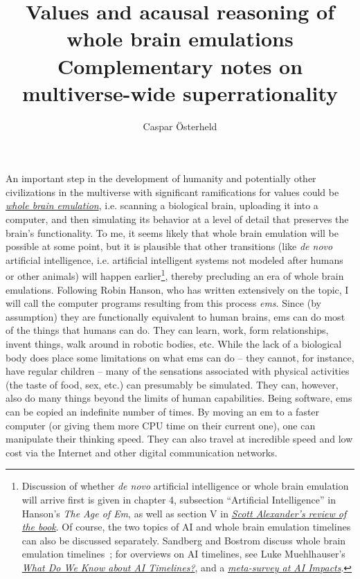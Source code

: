 \documentclass[]{article}
\title{Values and acausal reasoning of
whole brain emulations\\ \vspace{5mm} \small{Complementary notes on multiverse-wide superrationality}}
\author{Caspar \"Osterheld}
\date{}
\begin{document}
\maketitle

An important step in the development of humanity and potentially other
civilizations in the multiverse with significant ramifications for
values could be
\href{https://en.wikipedia.org/wiki/Mind_uploading}{\emph{whole
brain emulation}}, i.e. scanning a biological brain, uploading it into
a computer, and then simulating its behavior at a level of detail that
preserves the brain's functionality. To me, it seems likely that whole
brain emulation will be possible at some point, but it is plausible that
other transitions (like \emph{de novo} artificial intelligence, i.e.
artificial intelligent systems not modeled after humans or other
animals) will happen earlier\footnote{Discussion of whether \emph{de
  novo} artificial intelligence or whole brain emulation will arrive
  first is given in chapter 4, subsection ``Artificial Intelligence'' in
  Hanson's \emph{The Age of Em}, as well as section V in
  \href{http://slatestarcodex.com/2016/05/28/book-review-age-of-em/}{\emph{Scott
  Alexander's review of the book}}. Of course, the two topics of AI and
  whole brain emulation timelines can also be discussed separately.
  Sandberg and Bostrom discuss whole brain emulation
  timelines~\parencite{Sandberg2008-nd}; for overviews on AI timelines, see Luke Muehlhauser's
  \href{http://www.openphilanthropy.org/focus/global-catastrophic-risks/potential-risks-advanced-artificial-intelligence/ai-timelines}{\emph{What Do We Know about AI Timelines?}}, and a
  \href{http://aiimpacts.org/ai-timeline-surveys/}{\emph{meta-survey at
  AI Impacts}}.}, thereby precluding an era of whole brain
emulations. Following Robin Hanson, who has written extensively on the
topic, I will call the computer programs resulting from this process
\emph{ems}. Since (by assumption) they are functionally equivalent to
human brains, ems can do most of the things that humans can do. They can
learn, work, form relationships, invent things, walk around in robotic
bodies, etc. While the lack of a biological body does place some
limitations on what ems can do -- they cannot, for instance, have
regular children -- many of the sensations associated with physical
activities (the taste of food, sex, etc.) can presumably be simulated.
They can, however, also do many things beyond the limits of human
capabilities. Being software, ems can be copied an indefinite number of
times. By moving an em to a faster computer (or giving them more CPU
time on their current one), one can manipulate their thinking speed.
They can also travel at incredible speed and low cost via the Internet
and other digital communication networks.
\end{document}
